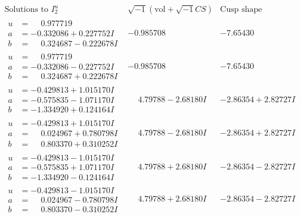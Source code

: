 \documentclass[1p]{elsarticle_modified}
\theoremstyle{definition}
\newcommand{\I}{\sqrt{-1}}
\begin{document}
$$\begin{array}{c|c|c}  
\text{Solutions to }I^u_{2}& \I (\text{vol} + \sqrt{-1}CS) & \text{Cusp shape}\\
 \hline 
\begin{aligned}
u &= \phantom{-}0.977719\phantom{ +0.000000I} \\
a &= -0.332086 + 0.227752 I \\
b &= \phantom{-}0.324687 - 0.222678 I\end{aligned}
 & -0.985708\phantom{ +0.000000I} & -7.65430\phantom{ +0.000000I} \\ \hline\begin{aligned}
u &= \phantom{-}0.977719\phantom{ +0.000000I} \\
a &= -0.332086 - 0.227752 I \\
b &= \phantom{-}0.324687 + 0.222678 I\end{aligned}
 & -0.985708\phantom{ +0.000000I} & -7.65430\phantom{ +0.000000I} \\ \hline\begin{aligned}
u &= -0.429813 + 1.015170 I \\
a &= -0.575835 - 1.071170 I \\
b &= -1.334920 + 0.124164 I\end{aligned}
 & \phantom{-}4.79788 - 2.68180 I & -2.86354 + 2.82727 I \\ \hline\begin{aligned}
u &= -0.429813 + 1.015170 I \\
a &= \phantom{-}0.024967 + 0.780798 I \\
b &= \phantom{-}0.803370 + 0.310252 I\end{aligned}
 & \phantom{-}4.79788 - 2.68180 I & -2.86354 + 2.82727 I \\ \hline\begin{aligned}
u &= -0.429813 - 1.015170 I \\
a &= -0.575835 + 1.071170 I \\
b &= -1.334920 - 0.124164 I\end{aligned}
 & \phantom{-}4.79788 + 2.68180 I & -2.86354 - 2.82727 I \\ \hline\begin{aligned}
u &= -0.429813 - 1.015170 I \\
a &= \phantom{-}0.024967 - 0.780798 I \\
b &= \phantom{-}0.803370 - 0.310252 I\end{aligned}
 & \phantom{-}4.79788 + 2.68180 I & -2.86354 - 2.82727 I \\ \hline\begin{aligned}

\end{aligned}
\end{array}$$
\end{document}
